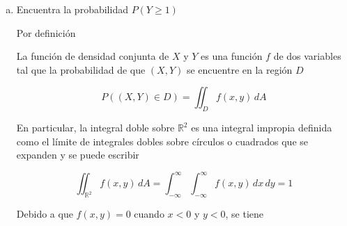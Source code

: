 \documentclass[12pt]{exam}
\begin{document}
\begin{questions}
  \begin{enumerate}[a)]
  \item Encuentra la probabilidad $P(Y \geq 1)$

    Por definición
    
    \begin{tcolorbox}[colback=white, colframe=blue!40!black, title=\textbf{Función de densidad conjunta}]
      La función de densidad conjunta de $X$ y $Y$ es una función $f$ de dos variables tal que la probabilidad de que $(X,Y)$ se encuentre en la región $D$
      
      \begin{equation}
        P((X,Y)\in D) = \iint_D f(x,y)\,dA
      \end{equation}

      En particular, la integral doble sobre $\mathbb{R}^2$ es una integral impropia definida como el límite de integrales dobles sobre círculos o cuadrados que se expanden y se puede escribir

      \begin{equation}
        \iint_{\mathbb{R}^2} f(x,y)\,dA = \int_{-\infty}^{\infty} \int_{-\infty}^{\infty}f(x,y)\,dx\,dy=1
      \end{equation}
    \end{tcolorbox}

    Debido a que $f(x,y)=0$ cuando $x<0$ y $y<0$, se tiene


\end{enumerate}
\end{questions}
\end{document}
